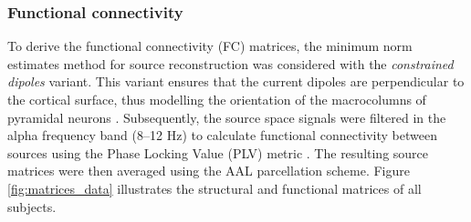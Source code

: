 \documentclass[../main.tex]{subfiles}
\begin{document}
\subsubsection{Functional connectivity}
To derive the functional connectivity (FC) matrices, the minimum norm estimates method for source reconstruction was considered \citep{hamalainen1994interpreting} with the \textit{constrained dipoles} variant.
This variant ensures that the current dipoles are perpendicular to the cortical surface, thus modelling the orientation of the macrocolumns of pyramidal neurons \citep{tadel2019meg}.
Subsequently, the source space signals were filtered in the alpha frequency band (8–12 Hz) to calculate functional connectivity between sources using the Phase Locking Value (PLV) metric \citep{lachaux1999measuring}.
The resulting source matrices were then averaged using the AAL parcellation scheme.
Figure \ref{fig:matrices_data} illustrates the structural and functional matrices of all subjects.
\end{document}
